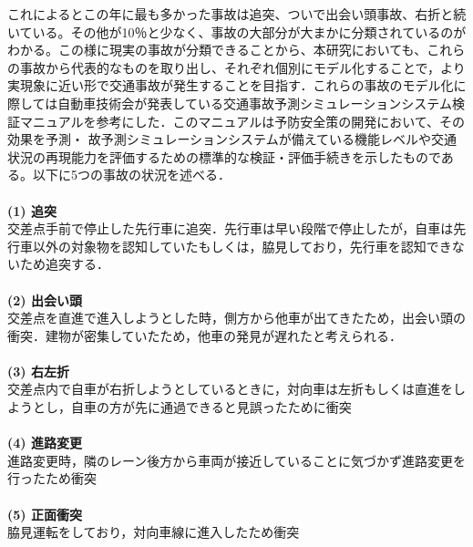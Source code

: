 \documentclass[14pt,a4j]{jsarticle}
\begin{document}
これによるとこの年に最も多かった事故は追突、ついで出会い頭事故、右折と続いている。その他が10％と少なく、事故の大部分が大まかに分類されているのがわかる。この様に現実の事故が分類できることから、本研究においても、これらの事故から代表的なものを取り出し、それぞれ個別にモデル化することで，より実現象に近い形で交通事故が発生することを目指す．これらの事故のモデル化に際しては自動車技術会が発表している交通事故予測シミュレーションシステム検証マニュアル\cite{manual2013}を参考にした．このマニュアルは予防安全策の開発において、その効果を予測・
故予測シミュレーションシステムが備えている機能レベルや交通状況の再現能力を評価するための標準的な検証・評価手続きを示したものである。以下に5つの事故の状況を述べる．\\\\
\textbf{(1) 追突}\\交差点手前で停止した先行車に追突．先行車は早い段階で停止したが，自車は先行車以外の対象物を認知していたもしくは，脇見しており，先行車を認知できないため追突する．\\\\
\textbf{(2) 出会い頭}\\ 交差点を直進で進入しようとした時，側方から他車が出てきたため，出会い頭の衝突．建物が密集していたため，他車の発見が遅れたと考えられる．\\\\
\textbf{(3) 右左折}\\ 交差点内で自車が右折しようとしているときに，対向車は左折もしくは直進をしようとし，自車の方が先に通過できると見誤ったために衝突\\\\
\textbf{(4) 進路変更}\\進路変更時，隣のレーン後方から車両が接近していることに気づかず進路変更を行ったため衝突\\\\
\textbf{(5) 正面衝突}\\ 脇見運転をしており，対向車線に進入したため衝突
\newpage
\end{document}
